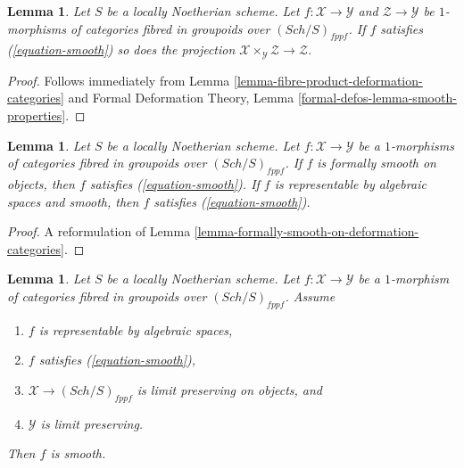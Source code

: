 \documentclass{stacks-project}
\theoremstyle{plain}
\newtheorem{lemma}[subsection]{Lemma}
\theoremstyle{definition}
\theoremstyle{remark}
\numberwithin{equation}{subsection}
\def\Sch{\mathit{Sch}}
\begin{document}
\begin{lemma}
\label{lemma-base-change-smooth}
Let $S$ be a locally Noetherian scheme. Let $f : \mathcal{X} \to \mathcal{Y}$
and $\mathcal{Z} \to \mathcal{Y}$ be $1$-morphisms of
categories fibred in groupoids over $(\Sch/S)_{fppf}$. If $f$
satisfies (\ref{equation-smooth}) so does the projection
$\mathcal{X} \times_\mathcal{Y} \mathcal{Z} \to \mathcal{Z}$.
\end{lemma}

\begin{proof}
Follows immediately from
Lemma \ref{lemma-fibre-product-deformation-categories}
and
Formal Deformation Theory, Lemma
\ref{formal-defos-lemma-smooth-properties}.
\end{proof}

\begin{lemma}
\label{lemma-smooth-smooth}
Let $S$ be a locally Noetherian scheme. Let $f : \mathcal{X} \to \mathcal{Y}$
be a $1$-morphisms of categories fibred in groupoids over $(\Sch/S)_{fppf}$.
If $f$ is formally smooth on objects, then $f$ satisfies
(\ref{equation-smooth}). If $f$ is representable by algebraic spaces
and smooth, then $f$ satisfies (\ref{equation-smooth}).
\end{lemma}

\begin{proof}
A reformulation of Lemma \ref{lemma-formally-smooth-on-deformation-categories}.
\end{proof}

\begin{lemma}
\label{lemma-implies-smooth}
Let $S$ be a locally Noetherian scheme. Let $f : \mathcal{X} \to \mathcal{Y}$
be a $1$-morphism of categories fibred in groupoids over $(\Sch/S)_{fppf}$.
Assume
\begin{enumerate}
\item $f$ is representable by algebraic spaces,
\item $f$ satisfies (\ref{equation-smooth}),
\item $\mathcal{X} \to (\Sch/S)_{fppf}$ is limit preserving on objects, and
\item $\mathcal{Y}$ is limit preserving.
\end{enumerate}
Then $f$ is smooth.
\end{lemma}
\end{document}
